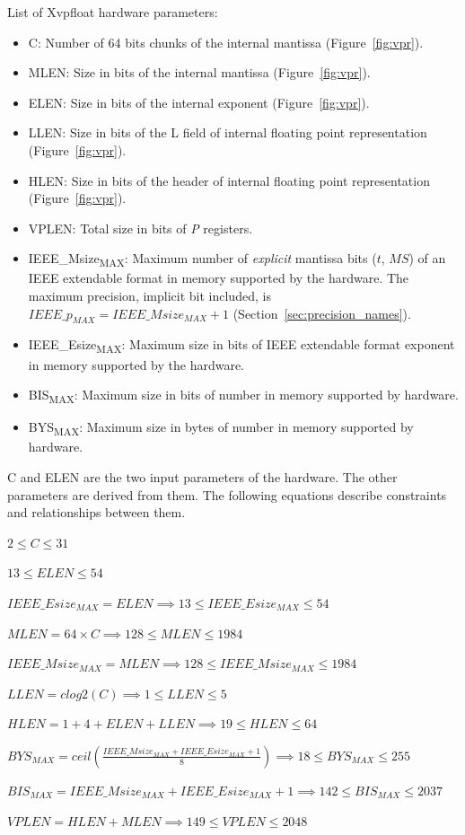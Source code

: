 List of Xvpfloat hardware parameters:
\begin{itemize}[topsep=0pt]
    \item C: Number of 64 bits chunks of the internal mantissa (Figure~\ref{fig:vpr}).
    \item MLEN: Size in bits of the internal mantissa (Figure~\ref{fig:vpr}).
    \item ELEN: Size in bits of the internal exponent (Figure~\ref{fig:vpr}).
    \item LLEN: Size in bits of the L field of internal floating point representation (Figure~\ref{fig:vpr}).
    \item HLEN: Size in bits of the header of internal floating point representation (Figure~\ref{fig:vpr}).
    \item VPLEN: Total size in bits of {\em P} registers.
    \item IEEE\_Msize\textsubscript{MAX}: Maximum number of \emph{explicit} mantissa bits ($t$, $MS$) of an IEEE extendable format in memory supported by the hardware.
    The maximum precision, implicit bit included, is $IEEE\_p_{MAX} = IEEE\_Msize_{MAX} + 1$ (Section~\ref{sec:precision_names}).
    \item IEEE\_Esize\textsubscript{MAX}: Maximum size in bits of IEEE extendable format exponent in memory supported by the hardware.
    \item BIS\textsubscript{MAX}: Maximum size in bits of number in memory supported by hardware.
    \item BYS\textsubscript{MAX}: Maximum size in bytes of number in memory supported by hardware.
\end{itemize}

C and ELEN are the two input parameters of the hardware. 
The other parameters are derived from them. 
The following equations describe constraints and relationships between them.

$ 2 \leq C \leq 31$

$13 \leq ELEN \leq 54$

$IEEE\_Esize_{MAX} = ELEN \implies 13 \leq IEEE\_Esize_{MAX} \leq 54$

$MLEN = 64 \times C \implies 128 \leq MLEN \leq 1984$

$IEEE\_Msize_{MAX} = MLEN \implies 128 \leq IEEE\_Msize_{MAX} \leq 1984$

$LLEN = clog2( C ) \implies 1 \leq LLEN \leq 5$

$HLEN = 1+4+ELEN+LLEN \implies 19 \leq HLEN \leq 64$

$BYS_{MAX} = ceil( \frac{IEEE\_Msize_{MAX}+IEEE\_Esize_{MAX}+1}{8} ) \implies 18 \leq BYS_{MAX} \leq 255$

$BIS_{MAX} = IEEE\_Msize_{MAX}+IEEE\_Esize_{MAX}+1 \implies 142 \leq BIS_{MAX} \leq 2037$

$VPLEN = HLEN+MLEN \implies 149 \leq VPLEN \leq 2048$
